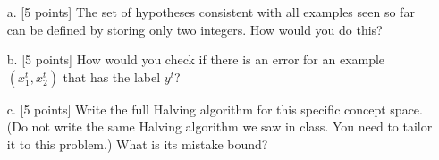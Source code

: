 \begin{enumerate}
  \begin{enumerate}
  \item[a.] [5 points] The set of hypotheses consistent with all
    examples seen so far can be defined by storing only two integers.
    How would you do this?
  \item[b.] [5 points] How would you check if there is an error for an
    example $(x_1^t, x_2^t)$ that has the label $y^t$?
  \item[c.] [5 points] Write the full Halving algorithm for this
    specific concept space. (Do not write the same Halving algorithm
    we saw in class. You need to tailor it to this problem.) What is
    its mistake bound?
  \end{enumerate}

\end{enumerate}


